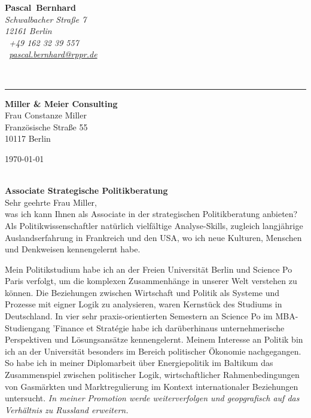 \documentclass[11pt,a4paper]{article}
\def\firstname{Pascal}
\def\familyname{Bernhard}
\begin{document}
\sffamily   %
\hfill%
\begin{minipage}[t]{.6\textwidth}
	\raggedleft%
	{\bfseries {\color{firstnamecolor}\firstname}~{\color{familynamecolor}\familyname}}\\[.35ex]
	\small\itshape%
	Schwalbacher Straße 7\\
	12161 Berlin\\[.35ex]
	\Mobilefone~+49 162 32 39 557 \\
	\Letter~\href{mailto:pascal.bernhard@rppr.de}{pascal.bernhard@rppr.de}
\end{minipage}\\[0.5em]
%
{\color{firstnamecolor}\rule{\textwidth}{.25ex}}
%
\begin{minipage}[t]{.4\textwidth}
	\raggedright%
	\vspace*{1em}
	\textbf{Miller \& Meier Consulting} \\
	Frau Constanze Miller \\[.35ex]
	\small%
	Französische Straße 55\\
	10117 Berlin
\end{minipage}
%
\hfill
%
\begin{minipage}[t]{.4\textwidth}
	\raggedleft %
	\today
\end{minipage}\\[1em]


{\bfseries \color{familynamecolor}Associate Strategische Politikberatung}\\[0.75em]

Sehr geehrte Frau Miller,\\[0.5em]
%

was ich kann Ihnen als Associate in der strategischen Politikberatung anbieten? Als Politikwissenschaftler natürlich vielfältige Analyse-Skills, zugleich langjährige Auslandserfahrung in Frankreich und den USA, wo ich neue Kulturen, Menschen und Denkweisen kennengelernt habe.

Mein Politikstudium habe ich an der Freien Universität Berlin und Science Po Paris verfolgt, um die komplexen Zusammenhänge in unserer Welt verstehen zu können. Die Beziehungen zwischen Wirtschaft und Politik als Systeme und Prozesse mit eigner Logik zu analysieren, waren Kernstück des Studiums in Deutschland. In vier sehr praxis-orientierten Semestern an Science Po im MBA-Studiengang 'Finance et Strat\'{e}gie habe ich darüberhinaus unternehmerische Perspektiven und Lösungsansätze kennengelernt. Meinem Interesse an Politik bin ich an der Universität besonders im Bereich politischer Ökonomie nachgegangen. So habe ich in meiner Diplomarbeit über Energiepolitik im Baltikum das Zusammenspiel zwischen politischer Logik, wirtschaftlicher Rahmenbedingungen von Gasmärkten und Marktregulierung im Kontext internationaler Beziehungen untersucht. \textsl{In meiner Promotion werde weiterverfolgen und geopgrafisch auf das Verhältnis zu Russland erweitern.}
\end{document}

